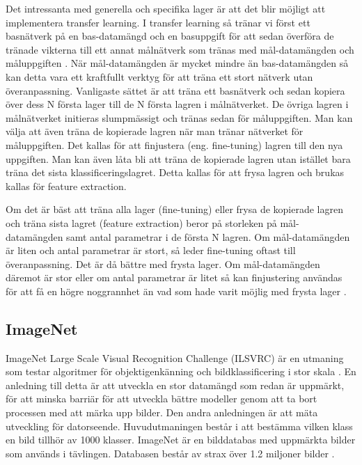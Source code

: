 \documentclass[]{kththesis}
\begin{document}
Det intressanta med generella och specifika lager är att det blir möjligt att implementera transfer learning. I transfer learning så tränar vi först ett basnätverk på en bas-datamängd och en basuppgift för att sedan överföra de tränade vikterna till ett annat målnätverk som tränas med mål-datamängden och måluppgiften \parencite{yosinski2014transferable}. När mål-datamängden är mycket mindre än bas-datamängden så kan detta vara ett kraftfullt verktyg för att träna ett stort nätverk utan överanpassning. Vanligaste sättet är att träna ett basnätverk och sedan kopiera över dess N första lager till de N första lagren i målnätverket. De övriga lagren i målnätverket initieras slumpmässigt och tränas sedan för måluppgiften. Man kan välja att även träna de kopierade lagren när man tränar nätverket för måluppgiften. Det kallas för att finjustera (eng. fine-tuning) lagren till den nya uppgiften. Man kan även låta bli att träna de kopierade lagren utan istället bara träna det sista klassificeringslagret. Detta kallas för att frysa lagren och brukas kallas för feature extraction.

Om det är bäst att träna alla lager (fine-tuning) eller frysa de kopierade lagren och träna sista lagret (feature extraction) beror på storleken på mål-datamängden samt antal parametrar i de första N lagren. Om mål-datamängden är liten och antal parametrar är stort, så leder fine-tuning oftast till överanpassning. Det är då bättre med frysta lager. Om mål-datamängden däremot är stor eller om antal parametrar är litet så kan finjustering användas för att få en högre noggrannhet än vad som hade varit möjlig med frysta lager \parencite{yosinski2014transferable}. 

\subsection{ImageNet}
ImageNet Large Scale Visual Recognition Challenge (ILSVRC) är en utmaning som testar algoritmer för objektigenkänning och bildklassificering i stor skala \parencite{ILSVRC15}. En anledning till detta är att utveckla en stor datamängd som redan är uppmärkt, för att minska barriär för att utveckla bättre modeller genom att ta bort processen med att märka upp bilder. Den andra anledningen är att mäta utveckling för datorseende. Huvudutmaningen består i att bestämma vilken klass en bild tillhör av 1000 klasser. ImageNet är en bilddatabas med uppmärkta bilder som används i tävlingen. Databasen består av strax över 1.2 miljoner bilder \parencite{huh2016makes}.
\end{document}
